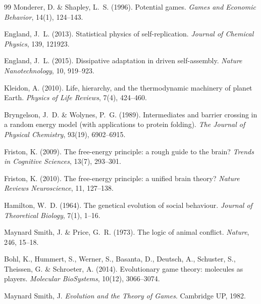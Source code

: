 \documentclass[12pt,a4paper]{article}
\theoremstyle{remark}
\begin{document}
\begin{thebibliography}{99}
Monderer, D. \& Shapley, L.~S. (1996).
\newblock Potential games.
\newblock \textit{Games and Economic Behavior}, 14(1), 124--143.

England, J.~L. (2013).
\newblock Statistical physics of self-replication.
\newblock \textit{Journal of Chemical Physics}, 139, 121923.

England, J.~L. (2015).
\newblock Dissipative adaptation in driven self-assembly.
\newblock \textit{Nature Nanotechnology}, 10, 919--923.

Kleidon, A. (2010).
\newblock Life, hierarchy, and the thermodynamic machinery of planet Earth.
\newblock \textit{Physics of Life Reviews}, 7(4), 424--460.

Bryngelson, J.~D. \& Wolynes, P.~G. (1989).
\newblock Intermediates and barrier crossing in a random energy model (with applications to protein folding).
\newblock \textit{The Journal of Physical Chemistry}, 93(19), 6902--6915.

Friston, K. (2009).
\newblock The free-energy principle: a rough guide to the brain?
\newblock \textit{Trends in Cognitive Sciences}, 13(7), 293--301.

Friston, K. (2010).
\newblock The free-energy principle: a unified brain theory?
\newblock \textit{Nature Reviews Neuroscience}, 11, 127--138.

Hamilton, W.~D. (1964).
\newblock The genetical evolution of social behaviour.
\newblock \textit{Journal of Theoretical Biology}, 7(1), 1--16.

Maynard Smith, J. \& Price, G.~R. (1973).
\newblock The logic of animal conflict.
\newblock \textit{Nature}, 246, 15--18.

Bohl, K., Hummert, S., Werner, S., Basanta, D., Deutsch, A., Schuster, S., Theissen, G. \& Schroeter, A. (2014).
\newblock Evolutionary game theory: molecules as players.
\newblock \textit{Molecular BioSystems}, 10(12), 3066--3074.

Maynard Smith, J.
\newblock \textit{Evolution and the Theory of Games}.
\newblock Cambridge UP, 1982.


\end{thebibliography}
\end{document}
